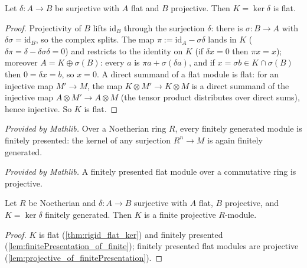 \begin{theorem}
  \label{thm:rigid_flat_ker}
  \leanok
  Let \(\delta : A \to B\) be surjective with \(A\) flat and \(B\) projective. Then
  \(K = \ker \delta\) is flat.
\end{theorem}
\begin{proof}
  \leanok
  Projectivity of \(B\) lifts \(\mathrm{id}_B\) through the surjection \(\delta\):
  there is \(\sigma : B \to A\) with \(\delta \sigma = \mathrm{id}_B\), so the complex
  splits. The map \(\pi := \mathrm{id}_A - \sigma\delta\) lands in \(K\)
  (\(\delta\pi = \delta - \delta\sigma\delta = 0\)) and restricts to the identity on
  \(K\) (if \(\delta x = 0\) then \(\pi x = x\)); moreover
  \(A = K \oplus \sigma(B)\): every \(a\) is \(\pi a + \sigma(\delta a)\), and if
  \(x = \sigma b \in K \cap \sigma(B)\) then \(0 = \delta x = b\), so \(x = 0\). A
  direct summand of a flat module is flat: for an injective map \(M' \to M\), the map
  \(K \otimes M' \to K \otimes M\) is a direct summand of the injective map
  \(A \otimes M' \to A \otimes M\) (the tensor product distributes over direct sums),
  hence injective. So \(K\) is flat.
\end{proof}

\begin{lemma}
  \label{lem:finitePresentation_of_finite}
  \mathlibok
  \textit{Provided by Mathlib.}
  Over a Noetherian ring \(R\), every finitely generated module is finitely presented:
  the kernel of any surjection \(R^n \to M\) is again finitely generated.
\end{lemma}

\begin{lemma}
  \label{lem:projective_of_finitePresentation}
  \mathlibok
  \textit{Provided by Mathlib.}
  A finitely presented flat module over a commutative ring is projective.
\end{lemma}

\begin{theorem}
  \label{thm:rigid_projective_ker}
  \leanok
  Let \(R\) be Noetherian and \(\delta : A \to B\) surjective with \(A\) flat, \(B\)
  projective, and \(K = \ker \delta\) finitely generated. Then \(K\) is a finite
  projective \(R\)-module.
\end{theorem}
\begin{proof}
  \leanok
  \(K\) is flat (\ref{thm:rigid_flat_ker}) and finitely presented
  (\ref{lem:finitePresentation_of_finite}); finitely presented flat modules are
  projective (\ref{lem:projective_of_finitePresentation}).
\end{proof}

